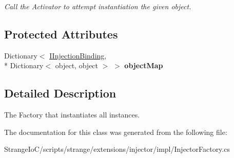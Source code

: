 \begin{DoxyCompactItemize}
\begin{DoxyCompactList}\small\item\em Call the Activator to attempt instantiation the given object. \end{DoxyCompactList}\end{DoxyCompactItemize}
\subsection*{Protected Attributes}
\begin{DoxyCompactItemize}
\item 
\hypertarget{classstrange_1_1extensions_1_1injector_1_1impl_1_1_injector_factory_a41ff79c05399567b47029445189c8d30}{Dictionary$<$ \hyperlink{interfacestrange_1_1extensions_1_1injector_1_1api_1_1_i_injection_binding}{I\-Injection\-Binding}, \\*
Dictionary$<$ object, object $>$ $>$ {\bfseries object\-Map}}\label{classstrange_1_1extensions_1_1injector_1_1impl_1_1_injector_factory_a41ff79c05399567b47029445189c8d30}

\end{DoxyCompactItemize}


\subsection{Detailed Description}
The Factory that instantiates all instances. 

The documentation for this class was generated from the following file\-:\begin{DoxyCompactItemize}
\item 
Strange\-Io\-C/scripts/strange/extensions/injector/impl/Injector\-Factory.\-cs\end{DoxyCompactItemize}
